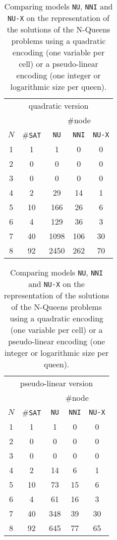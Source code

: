 \documentclass[a4paper,10pt]{article}
\begin{document}
\begin{table}[h]
\center
\begin{tabular}{|c | c | c | c | c |}
\multicolumn{5}{|c|}{quadratic version} \\
& & \multicolumn{3}{|c|}{\#node} \\
$N$ & \#\texttt{SAT} & \texttt{NU} & \texttt{NNI} & \texttt{NU-X} \\ \hline
1   & 1              & 1           & 0            & 0             \\
2   & 0              & 0           & 0            & 0             \\
3   & 0              & 0           & 0            & 0             \\
4   & 2              & 29          & 14           & 1             \\
5   & 10             & 166         & 26           & 6             \\
6   & 4              & 129         & 36           & 3             \\
7   & 40             & 1098        & 106          & 30            \\
8   & 92             & 2450        & 262          & 70            \\
\end{tabular}
\begin{tabular}{|c | c | c | c | c |}
\multicolumn{5}{|c|}{pseudo-linear version} \\
& & \multicolumn{3}{|c|}{\#node} \\
$N$ & \#\texttt{SAT} & \texttt{NU} & \texttt{NNI} & \texttt{NU-X} \\ \hline
1  & 1       & 1      & 0      & 0       \\
2  & 0       & 0      & 0      & 0       \\
3  & 0       & 0      & 0      & 0       \\
4  & 2       & 14     & 6      & 1       \\
5  & 10       & 73     & 15      & 6       \\
6  & 4       & 61     & 16      & 3       \\
7  & 40       & 348     & 39      & 30      \\
8  & 92       & 645     & 77      & 65      \\
\end{tabular}
\caption{Comparing models \texttt{NU}, \texttt{NNI} and \texttt{NU-X} on the representation of the solutions of the N-Queens problems using a quadratic encoding (one variable per cell) or a pseudo-linear encoding (one integer or logarithmic size per queen).}
\label{table-nqueens}
\end{table}
\end{document}
